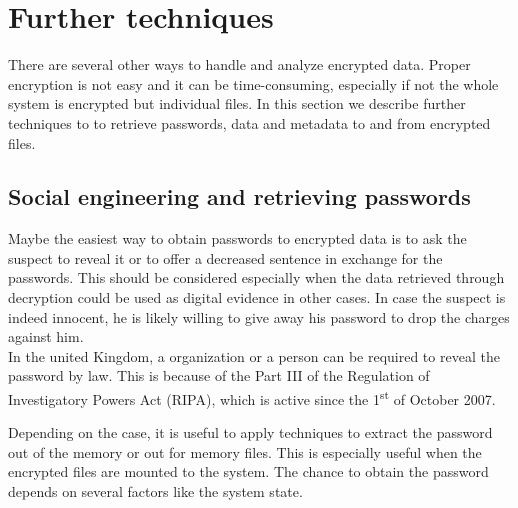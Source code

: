 \section{Further techniques}
There are several other ways to handle and analyze encrypted data. Proper encryption is not easy and it can be time-consuming, especially if not the whole system is encrypted but individual files. In this section we describe further techniques to to retrieve passwords, data and metadata to and from encrypted files.
\subsection{Social engineering and retrieving passwords}
Maybe the easiest way to obtain passwords to encrypted data is to ask the suspect to reveal it or to offer a decreased sentence in exchange for the passwords.
This should be considered especially when the data retrieved through decryption could be used as digital evidence in other cases.
In case the suspect is indeed innocent, he is likely willing to give away his password to drop the charges against him.\\
In the united Kingdom, a organization or a person can be required to reveal the password by law. This is because of the Part III of the Regulation of Investigatory Powers Act (RIPA), which is active since  the 1\textsuperscript{st} of October 2007.\cite{TheEffectOfFileAndDiskEncryption}

Depending on the case, it is useful to apply techniques to extract the password out of the memory or out for memory files. This is especially useful when the encrypted files are mounted to the system. The chance to obtain the password depends on several factors like the system state.\cite{MaartmannMoe2009S132}


